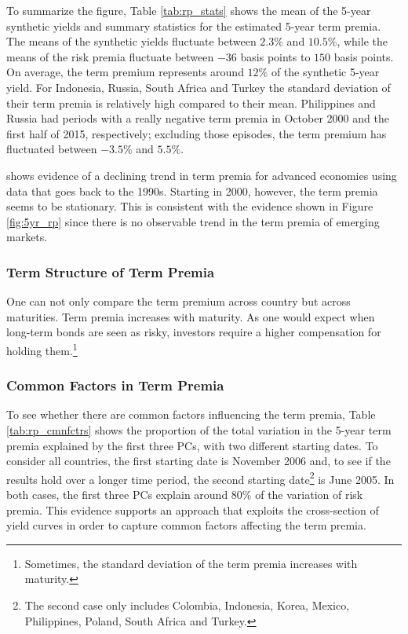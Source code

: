 To summarize the figure, Table \ref{tab:rp_stats} shows the mean of the 5-year synthetic yields and summary statistics for the estimated 5-year term premia. The means of the synthetic yields fluctuate between $2.3\%$ and $10.5\%$, while the means of the risk premia fluctuate between $-36$ basis points to $150$ basis points. On average, the term premium represents around $12\%$ of the synthetic 5-year yield. For Indonesia, Russia, South Africa and Turkey the standard deviation of their term premia is relatively high compared to their mean. Philippines and Russia had periods with a really negative term premia in October 2000 and the first half of 2015, respectively; excluding those episodes, the term premium has fluctuated between $-3.5\%$ and $5.5\%$.
	

\cite{Wright:2011} shows evidence of a declining trend in term premia for advanced economies using data that goes back to the 1990s. Starting in 2000, however, the term premia seems to be stationary. This is consistent with the evidence shown in Figure \ref{fig:5yr_rp} since there is no observable trend in the term premia of emerging markets.

\subsubsection{Term Structure of Term Premia}
One can not only compare the term premium across country but across maturities. Term premia increases with maturity. As one would expect when long-term bonds are seen as risky, investors require a higher compensation for holding them.\footnote{Sometimes, the standard deviation of the term premia increases with maturity.}

\subsubsection{Common Factors in Term Premia}
To see whether there are common factors influencing the term premia, Table \ref{tab:rp_cmnfctrs} shows the proportion of the total variation in the 5-year term premia explained by the first three PCs, with two different starting dates. To consider all countries, the first starting date is November 2006 and, to see if the results hold over a longer time period, the second starting date\footnote{The second case only includes Colombia, Indonesia, Korea, Mexico, Philippines, Poland, South Africa and Turkey.} is June 2005. In both cases, the first three PCs explain around $80\%$ of the variation of risk premia. This evidence supports an approach that exploits the cross-section of yield curves in order to capture common factors affecting the term premia.
%	

